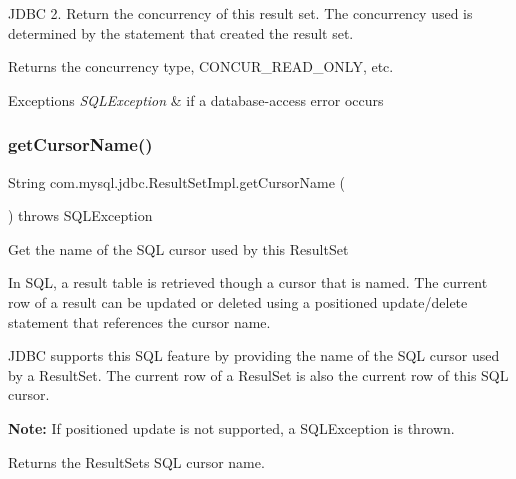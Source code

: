 J\+D\+BC 2. Return the concurrency of this result set. The concurrency used is determined by the statement that created the result set.

\begin{DoxyReturn}{Returns}
the concurrency type, C\+O\+N\+C\+U\+R\+\_\+\+R\+E\+A\+D\+\_\+\+O\+N\+LY, etc.
\end{DoxyReturn}

\begin{DoxyExceptions}{Exceptions}
{\em S\+Q\+L\+Exception} & if a database-\/access error occurs \\
\hline
\end{DoxyExceptions}
\mbox{\label{classcom_1_1mysql_1_1jdbc_1_1_result_set_impl_a89ff94442cf6ac6f5b9cc9fc1be1d8ed}} 
\subsubsection{\texorpdfstring{get\+Cursor\+Name()}{getCursorName()}}
{\footnotesize\ttfamily String com.\+mysql.\+jdbc.\+Result\+Set\+Impl.\+get\+Cursor\+Name (\begin{DoxyParamCaption}{ }\end{DoxyParamCaption}) throws S\+Q\+L\+Exception}

Get the name of the S\+QL cursor used by this Result\+Set

In S\+QL, a result table is retrieved though a cursor that is named. The current row of a result can be updated or deleted using a positioned update/delete statement that references the cursor name. 

J\+D\+BC supports this S\+QL feature by providing the name of the S\+QL cursor used by a Result\+Set. The current row of a Resul\+Set is also the current row of this S\+QL cursor. 

{\bfseries Note\+:} If positioned update is not supported, a S\+Q\+L\+Exception is thrown. 

\begin{DoxyReturn}{Returns}
the Result\+Set\textquotesingle{}s S\+QL cursor name.
\end{DoxyReturn}


